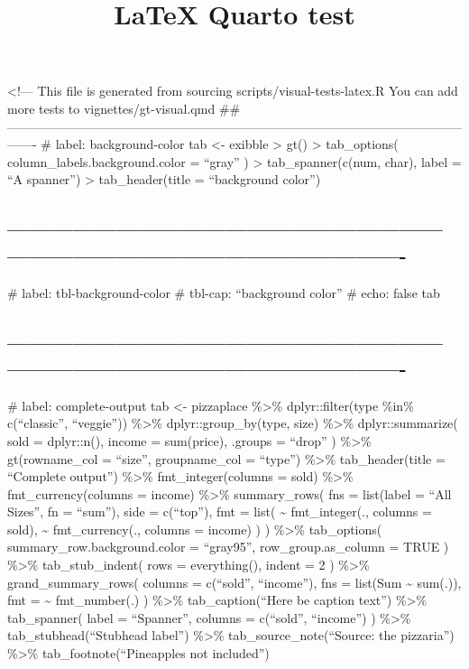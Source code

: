 \documentclass[
  letterpaper,
  DIV=11,
  numbers=noendperiod]{scrartcl}
\title{LaTeX Quarto test}
\author{}
\date{}
\begin{document}
\maketitle

\listoftables

\textless!--- This file is generated from sourcing
scripts/visual-tests-latex.R You can add more tests to
vignettes/gt-visual.qmd \#\#
-------------------------------------------------------------------------------------------------------------------
\#\textbar{} label: background-color tab \textless- exibble
\textbar\textgreater{} gt() \textbar\textgreater{} tab\_options(
column\_labels.background.color = ``gray'' ) \textbar\textgreater{}
tab\_spanner(c(num, char), label = ``A spanner'') \textbar\textgreater{}
tab\_header(title = ``background color'')

\subsection{-------------------------------------------------------------------------------------------------------------------}\label{section}

\#\textbar{} label: tbl-background-color \#\textbar{} tbl-cap:
``background color'' \#\textbar{} echo: false tab

\subsection{-------------------------------------------------------------------------------------------------------------------}\label{section-1}

\#\textbar{} label: complete-output tab \textless- pizzaplace
\%\textgreater\% dplyr::filter(type \%in\% c(``classic'', ``veggie''))
\%\textgreater\% dplyr::group\_by(type, size) \%\textgreater\%
dplyr::summarize( sold = dplyr::n(), income = sum(price), .groups =
``drop'' ) \%\textgreater\% gt(rowname\_col = ``size'', groupname\_col =
``type'') \%\textgreater\% tab\_header(title = ``Complete output'')
\%\textgreater\% fmt\_integer(columns = sold) \%\textgreater\%
fmt\_currency(columns = income) \%\textgreater\% summary\_rows( fns =
list(label = ``All Sizes'', fn = ``sum''), side = c(``top''), fmt =
list( \textasciitilde{} fmt\_integer(., columns = sold),
\textasciitilde{} fmt\_currency(., columns = income) ) )
\%\textgreater\% tab\_options( summary\_row.background.color =
``gray95'', row\_group.as\_column = TRUE ) \%\textgreater\%
tab\_stub\_indent( rows = everything(), indent = 2 ) \%\textgreater\%
grand\_summary\_rows( columns = c(``sold'', ``income''), fns = list(Sum
\textasciitilde{} sum(.)), fmt = \textasciitilde{} fmt\_number(.) )
\%\textgreater\% tab\_caption(``Here be caption text'') \%\textgreater\%
tab\_spanner( label = ``Spanner'', columns = c(``sold'', ``income'') )
\%\textgreater\% tab\_stubhead(``Stubhead label'') \%\textgreater\%
tab\_source\_note(``Source: the pizzaria'') \%\textgreater\%
tab\_footnote(``Pineapples not included'')
\end{document}
